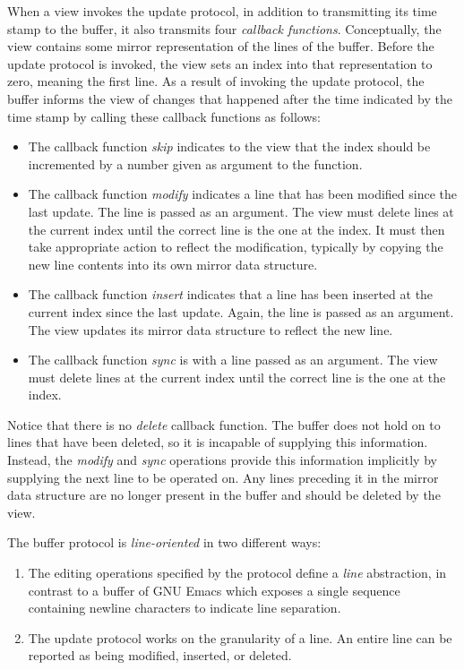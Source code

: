 When a view invokes the update protocol, in addition to transmitting
its time stamp to the buffer, it also transmits four \emph{callback
  functions}.  Conceptually, the view contains some mirror
representation of the lines of the buffer.  Before the update protocol
is invoked, the view sets an index into that representation to zero,
meaning the first line.  As  a result of invoking the update protocol,
the buffer informs the view of changes that happened after the time
indicated by the time stamp by calling these callback functions as
follows:

\begin{itemize}
\item The callback function \emph{skip} indicates to the view that the
  index should be incremented by a number given as argument to the
  function.
\item The callback function \emph{modify} indicates a line that has been
  modified since the last update.  The line is passed as an argument.
  The view must delete lines at the current index until the correct
  line is the one at the index.  It must then take appropriate action
  to reflect the modification, typically by copying the new line
  contents into its own mirror data structure.
\item The callback function \emph{insert} indicates that a line has
  been inserted at the current index since the last update.  Again,
  the line is passed as an argument.  The view updates its mirror data
  structure to reflect the new line.
\item The callback function \emph{sync} is with a line passed as an
  argument.  The view must delete lines at the current index until the
  correct line is the one at the index.
\end{itemize}

Notice that there is no \emph{delete} callback function.  The buffer
does not hold on to lines that have been deleted, so it is incapable
of supplying this information.  Instead, the \emph{modify} and
\emph{sync} operations provide this information implicitly by
supplying the next line to be operated on.  Any lines preceding it in
the mirror data structure are no longer present in the buffer and
should be deleted by the view.

The buffer protocol is \emph{line-oriented} in two different ways:

\begin{enumerate}
\item The editing operations specified by the protocol define a
  \emph{line} abstraction, in contrast to a buffer of GNU Emacs
  \cite{Finseth:1980:TPTa} which exposes a single sequence containing
  newline characters to indicate line separation.
\item The update protocol works on the granularity of a line.  An
  entire line can be reported as being modified, inserted, or
  deleted.
\end{enumerate}

